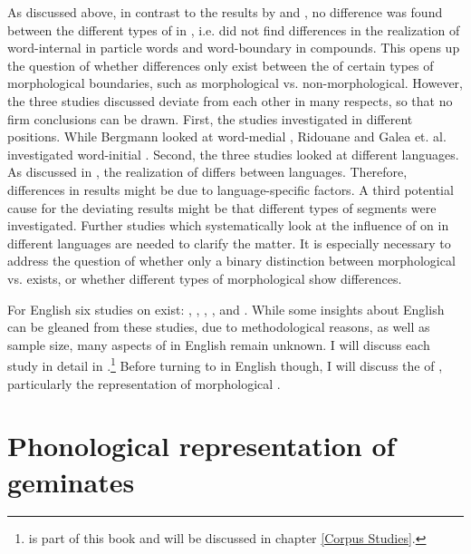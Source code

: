 As discussed above, in contrast to the results by \cite{Ridouane.2010} and \cite{Galea.2014}, no difference was found between the different types of  in \cite{Bergmann.2017}, i.e. \cite{Bergmann.2017} did not find differences in the realization of word-internal  in particle words and word-boundary  in compounds. This opens up the question of whether differences only exist between the  of certain types of morphological boundaries, such as morphological vs. non-morphological. However, the three studies discussed deviate from each other in many respects, so that no firm conclusions can be drawn. First, the studies investigated  in different positions. While Bergmann looked at word-medial , Ridouane and Galea et. al. investigated word-initial . Second, the three studies looked at different languages. As discussed in , the realization of  differs between languages. Therefore, differences in results might be due to language-specific factors. A third potential cause for the deviating results might be that different types of segments were investigated. Further studies which systematically look at the influence of  on  in different languages are needed to clarify the matter. It is especially necessary to address the question of whether only a binary distinction between morphological vs.  exists, or whether different types of morphological  show differences.


For English six studies on  exist: \cite{Delattre.}, \citet{Kaye.2005}, \citet{Oh.2012}, \cite{Oh.2013}, \cite{Kotzor.2016} and \cite{BenHedia.2017}. While some insights about English  can be gleaned from these studies, due to methodological reasons, as well as sample size, many aspects of  in English remain unknown. I will discuss each study in detail in .\footnote{\cite{BenHedia.2017} is part of this book and will be discussed in chapter \ref{Corpus Studies}.} Before turning to  in English though, I will discuss the  of , particularly the representation of morphological .



\section{Phonological representation of geminates } \label{Phonological representation of geminates}

